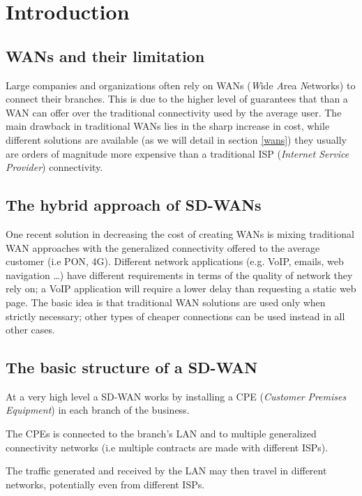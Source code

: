 \section{Introduction}

\subsection{WANs and their limitation}

Large companies and organizations often rely on  WANs (\textit{W}ide \textit{A}rea \textit{N}etworks) to connect their branches. This is due to the higher level of guarantees that than a WAN can offer over the traditional connectivity used by the average user. The main drawback in traditional WANs lies in the sharp increase in cost, while different solutions are available (as we will detail in section \ref{wans}) they usually are orders of magnitude more expensive than a traditional ISP (\textit{Internet Service Provider}) connectivity.


\subsection{The hybrid approach of SD-WANs}

One recent solution in decreasing the cost of creating WANs is mixing traditional WAN approaches with the generalized connectivity offered to the average customer (i.e PON, 4G).
Different network applications (e.g. VoIP, emails, web navigation \dots) have different requirements in terms of the quality of network they rely on; a VoIP application will require a lower delay than requesting a static web page.
The basic idea is that traditional WAN solutions are used only when strictly necessary; other types of cheaper connections can be used instead in all other cases.

\subsection{The basic structure of a SD-WAN}
At a very high level a SD-WAN works by installing a CPE (\textit{Customer} \textit{Premises} \textit{Equipment}) in each branch of the business.

The CPEs is connected to the branch's LAN and to multiple generalized connectivity networks (i.e multiple contracts are made with different ISPs).

The traffic generated and received by the LAN may then travel in different networks, potentially even from different ISPs.

